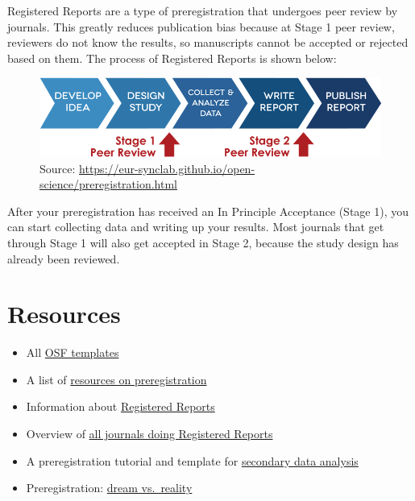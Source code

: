 \documentclass[
  letterpaper,
  DIV=11,
  numbers=noendperiod]{scrreprt}
\begin{document}
Registered Reports are a type of preregistration that undergoes peer
review by journals. This greatly reduces publication bias because at
Stage 1 peer review, reviewers do not know the results, so manuscripts
cannot be accepted or rejected based on them. The process of Registered
Reports is shown below:

\begin{figure}

{\centering \includegraphics[width=6.25in,height=\textheight]{regreports.png}

}

\caption{Source:
\url{https://eur-synclab.github.io/open-science/preregistration.html}}

\end{figure}

After your preregistration has received an In Principle Acceptance
(Stage 1), you can start collecting data and writing up your results.
Most journals that get through Stage 1 will also get accepted in Stage
2, because the study design has already been reviewed.

\hypertarget{resources}{%
\section*{\texorpdfstring{\textbf{Resources}}{Resources}}\label{resources}}


\begin{itemize}
\item
  All \href{https://osf.io/zab38/wiki/home/}{OSF templates}
\item
  A list of \href{https://www.cos.io/our-services/prereg}{resources on
  preregistration}
\item
  Information about
  \href{https://www.cos.io/our-services/registered-reports}{Registered
  Reports}
\item
  Overview of
  \href{https://docs.google.com/spreadsheets/d/1D4_k-8C_UENTRtbPzXfhjEyu3BfLxdOsn9j-otrO870/edit?usp=sharing}{all
  journals doing Registered Reports}
\item
  A preregistration tutorial and template for
  \href{https://psyarxiv.com/hvfmr}{secondary data analysis}
\item
  Preregistration: \href{https://psyarxiv.com/d8wex/}{dream vs.~reality}
\end{itemize}
\end{document}
